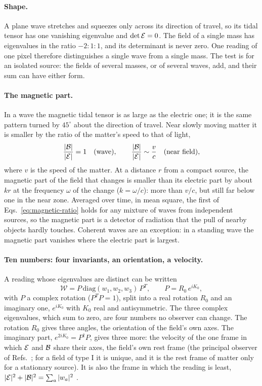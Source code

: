 \paragraph{Shape.} A plane wave stretches and squeezes only across its
direction of travel, so its tidal tensor has one vanishing eigenvalue and
$\det\mathcal{E} = 0$. The field of a single mass has eigenvalues in the ratio
$-2 : 1 : 1$, and its determinant is never zero. One reading of one pixel
therefore distinguishes a single wave from a single mass. The test is for an
isolated source: the fields of several masses, or of several waves, add, and
their sum can have either form.

\paragraph{The magnetic part.} In a wave the magnetic tidal tensor is as large
as the electric one; it is the same pattern turned by $45^\circ$ about the
direction of travel. Near slowly moving matter it is smaller by the ratio of
the matter's speed to that of light,
\begin{equation}\label{eq:magnetic-ratio}
\frac{|\mathcal{B}|}{|\mathcal{E}|} = 1 \quad\text{(wave)},
\qquad
\frac{|\mathcal{B}|}{|\mathcal{E}|} \sim \frac{v}{c} \quad\text{(near field)} ,
\end{equation}
where $v$ is the speed of the matter. At a distance $r$ from a compact source,
the magnetic part of the field that changes is smaller than its
electric part by about $kr$ at the frequency $\omega$ of the change ($k = \omega/c$): more
than $v/c$, but still far below one in the near zone.
Averaged over time, in mean square, the first of Eqs.~\eqref{eq:magnetic-ratio} holds for any mixture of waves from independent
sources, so the magnetic part is a detector of radiation that the pull of
nearby objects hardly touches. Coherent waves are an exception: in a standing
wave the magnetic part vanishes where the electric part is largest.

\paragraph{Ten numbers: four invariants, an orientation, a velocity.} A
reading whose eigenvalues are distinct can be written
\begin{equation}\label{eq:polar}
\mathcal{W} = P\,\mathrm{diag}(w_1, w_2, w_3)\,P^{T}, \qquad
P = R_0\,e^{iK_0},
\end{equation}
with $P$ a complex rotation ($P^TP = 1$), split into a real rotation $R_0$ and an
imaginary one, $e^{iK_0}$ with $K_0$ real and antisymmetric. The three complex eigenvalues, which sum to zero, are four
numbers no observer can change. The rotation $R_0$ gives three angles, the
orientation of the field's own axes. The imaginary part,
$e^{2iK_0} = P^{\dagger}P$, gives three more: the velocity of the one frame in
which $\mathcal{E}$ and $\mathcal{B}$ share their axes, the field's own rest frame (the
principal observer of Refs.~\cite{CostaWyllemanNatario2021,WyllemanCostaNatario2021}; for a field of type I
it is unique, and it is the rest frame of matter only for a stationary
source). It is also the frame in which the reading is least,
$|\mathcal{E}|^2 + |\mathcal{B}|^2 = \sum_a|w_a|^2$ \cite{FerrandoSaez2012}.

